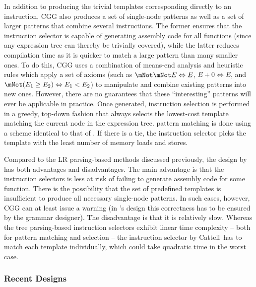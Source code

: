 In addition to producing the trivial \glspl{template} corresponding directly to
an \gls{instruction}, \gls{CGG} also produces a set of single-\gls{node}
\glspl{pattern} as well as a set of larger \glspl{pattern} that combine several
\glspl{instruction}.
%
The former ensures that the \gls{instruction selector} is capable of generating
\gls{assembly code} for all \glspl{function} (since any \gls{expression tree}
can thereby be trivially covered), while the latter reduces compilation time as
it is quicker to match a large \gls{pattern} than many smaller ones.
%
To do this, \gls{CGG} uses a combination of \gls{means-end analysis} and
heuristic \glspl{rule} which apply a set of axioms (such as \mbox{$\mNot \mNot E
  \Leftrightarrow E$}, \mbox{$E + 0 \Leftrightarrow E$}, and \mbox{$\mNot (E_1
  \geq E_2) \Leftrightarrow E_1 < E_2$}) to manipulate and combine existing
\glspl{pattern} into new ones.
%
However, there are no guarantees that these ``interesting'' \glspl{pattern} will
ever be applicable in practice.
%
Once generated, \gls{instruction selection} is performed in a greedy, top-down
fashion that always selects the lowest-cost \gls{template} matching the current
\gls{node} in the \gls{expression tree}.
%
\Gls{pattern matching} is done using a scheme identical to that of
\citeauthor{Newcomer:1975}.
%
If there is a tie, the \gls{instruction selector} picks the \gls{template} with
the least number of memory loads and stores.

Compared to the \gls{LR parsing}-based methods discussed previously, the design
by \citeauthor{CattellEtAl:1979} has both advantages and disadvantages.
%
The main advantage is that the \glspl{instruction selector} is less at risk of
failing to generate \gls{assembly code} for some \gls{function}.
%
There is the possibility that the set of predefined \glspl{template} is
insufficient to produce all necessary single-node \glspl{pattern}.
%
In such cases, however, \gls{CGG} can at least issue a warning (in
\citeauthor{GanapathiEtAl:1982:AttrGr}'s design this correctness has to be
ensured by the \gls{grammar} designer).
%
The disadvantage is that it is relatively slow.
%
Whereas the \gls{tree parsing}-based \glspl{instruction selector} exhibit linear
time complexity -- both for \gls{pattern matching} and selection -- the
\gls{instruction selector} by Cattell~\etal has to match each \gls{template}
individually, which could take quadratic time in the worst case.


\subsubsection{Recent Designs}

